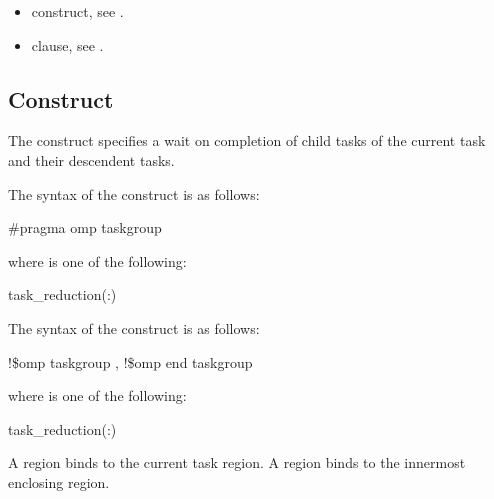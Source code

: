 {{{{\crossreferences

\begin{itemize}
\item {} construct, see .
\item {} clause, see .
\end{itemize}












\subsection{ Construct}
\label{subsec:taskgroup Construct}
\summary
The  construct specifies a wait on completion of child tasks of the current 
task and their descendent tasks.

\syntax
\ccppspecificstart
The syntax of the  construct is as follows:

\begin{boxedcode}
\#pragma omp taskgroup  
\end{boxedcode}
\ccppspecificend

where  is one of the following:

\begin{indentedcodelist}
task_reduction(:)
\end{indentedcodelist}

\fortranspecificstart
The syntax of the  construct is as follows:

\begin{boxedcode}
!\$omp taskgroup \plc{[clause [ [},\plc{] clause] ...]}
!\$omp end taskgroup
\end{boxedcode}

where  is one of the following:

\begin{indentedcodelist}
task_reduction(:)
\end{indentedcodelist}

\fortranspecificend

\binding
A  region binds to the current task region. A  region binds to 
the innermost enclosing  region. 

}}}}
